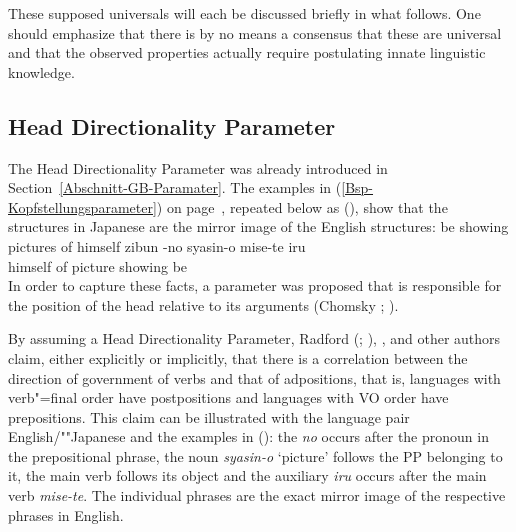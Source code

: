 \noindent
These supposed universals will each be discussed briefly in what follows. One should emphasize that there is by no means
a consensus that these are universal and that the observed properties actually require postulating innate linguistic
knowledge.

\subsection{Head Directionality Parameter}
\label{Abschnitt-Kopfstellungsparameter}

\mbox{}%
The Head Directionality Parameter was already introduced in Section~\ref{Abschnitt-GB-Paramater}. The examples in (\ref{Bsp-Kopfstellungsparameter}) on
page~\pageref{Bsp-Kopfstellungsparameter}, repeated below as (), show that the structures in Japanese are the mirror image of the English structures:
\eal
\label{Bsp-Kopfstellungsparameter-zwei}
\ex 
be showing pictures of himself
\ex
\gll zibun  -no syasin-o mise-te iru\\
     himself of picture showing be\\
\zl
In order to capture these facts, a parameter was proposed that is responsible for the position of the head relative to its
arguments (\eg Chomsky \citeyear[]{Chomsky86a}; \citeyear[]{Chomsky88a-u}). 

By assuming a Head Directionality Parameter, Radford (\citeyear[--61]{Radford90a-u}; \citeyear[--22]{Radford97a-u}), \citet[, 238]{Pinker94a}, \citet[]{Baker2003b}
and other authors claim, either explicitly or implicitly, that there is a correlation between the direction of government of verbs and that of adpositions, that is, languages
with verb"=final order have postpositions and languages with VO order have prepositions. This claim
can be illustrated with the language pair English/""Japanese and the
examples in (): the \emph{no} occurs after the pronoun in the prepositional phrase, the noun \emph{syasin-o} `picture' follows the PP belonging to it, the main verb follows its object and the
auxiliary \emph{iru} occurs after the main verb \emph{mise-te}. The individual phrases are the exact mirror image of
the respective phrases in English.


